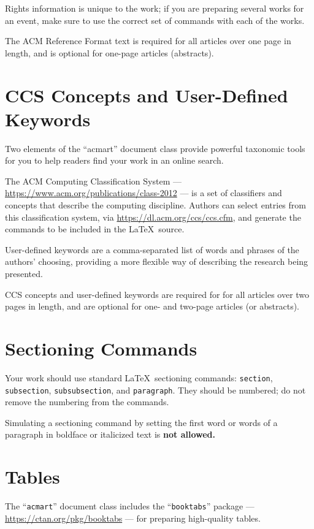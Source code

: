 \documentclass[sigconf]{acmart}
\begin{document}
Rights information is unique to the work; if you are preparing several
works for an event, make sure to use the correct set of commands with
each of the works.

The ACM Reference Format text is required for all articles over one
page in length, and is optional for one-page articles (abstracts).

\section{CCS Concepts and User-Defined Keywords}

Two elements of the ``acmart'' document class provide powerful
taxonomic tools for you to help readers find your work in an online
search.

The ACM Computing Classification System ---
\url{https://www.acm.org/publications/class-2012} --- is a set of
classifiers and concepts that describe the computing
discipline. Authors can select entries from this classification
system, via \url{https://dl.acm.org/ccs/ccs.cfm}, and generate the
commands to be included in the \LaTeX\ source.

User-defined keywords are a comma-separated list of words and phrases
of the authors' choosing, providing a more flexible way of describing
the research being presented.

CCS concepts and user-defined keywords are required for for all
articles over two pages in length, and are optional for one- and
two-page articles (or abstracts).

\section{Sectioning Commands}

Your work should use standard \LaTeX\ sectioning commands:
\verb|section|, \verb|subsection|, \verb|subsubsection|, and
\verb|paragraph|. They should be numbered; do not remove the numbering
from the commands.

Simulating a sectioning command by setting the first word or words of
a paragraph in boldface or italicized text is {\bfseries not allowed.}

\section{Tables}

The ``\verb|acmart|'' document class includes the ``\verb|booktabs|''
package --- \url{https://ctan.org/pkg/booktabs} --- for preparing
high-quality tables.
\end{document}
